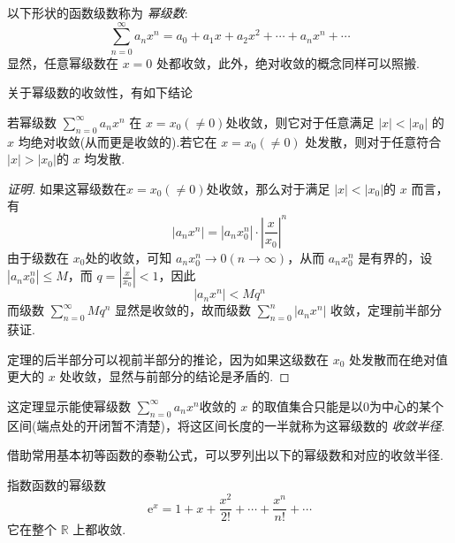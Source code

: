 以下形状的函数级数称为 \emph{幂级数}:
\[ \sum_{n=0}^{\infty} a_nx^n = a_0+a_1x+a_2x^2+\cdots + a_nx^n+\cdots \]
显然，任意幂级数在 $x=0$ 处都收敛，此外，绝对收敛的概念同样可以照搬.

关于幂级数的收敛性，有如下结论
\begin{theorem}
  若幂级数 $\sum_{n=0}^{\infty}a_nx^n$ 在 $x=x_0(\neq 0)$处收敛，则它对于任意满足 $|x|<|x_0|$ 的 $x$ 均绝对收敛(从而更是收敛的).若它在 $x=x_0(\neq 0)$ 处发散，则对于任意符合 $|x|>|x_0|$的 $x$ 均发散.
\end{theorem}

\begin{proof}[证明]
  如果这幂级数在$x=x_0(\neq 0)$处收敛，那么对于满足 $|x|<|x_0|$的 $x$ 而言，有
  \[ |a_nx^n| = |a_nx_0^n| \cdot \left| \frac{x}{x_0} \right|^n \]
  由于级数在 $x_0$处的收敛，可知 $a_nx_0^n \to 0 (n \to \infty)$，从而 $a_nx_0^n$ 是有界的，设 $|a_nx_0^n| \leqslant M$，而 $q=\left| \frac{x}{x_0} \right| < 1$，因此
  \[ |a_nx^n| < Mq^n \]
  而级数 $\sum_{n=0}^{\infty} Mq^n$ 显然是收敛的，故而级数 $\sum_{n=0}^n|a_nx^n|$ 收敛，定理前半部分获证.

  定理的后半部分可以视前半部分的推论，因为如果这级数在 $x_0$ 处发散而在绝对值更大的 $x$ 处收敛，显然与前部分的结论是矛盾的.
\end{proof}

这定理显示能使幂级数 $\sum_{n=0}^{\infty} a_nx^n$收敛的 $x$ 的取值集合只能是以$0$为中心的某个区间(端点处的开闭暂不清楚)，将这区间长度的一半就称为这幂级数的 \emph{收敛半径}.

\begin{example}
  借助常用基本初等函数的泰勒公式，可以罗列出以下的幂级数和对应的收敛半径.

  指数函数的幂级数
  \[ \mathrm{e}^x = 1 + x + \frac{x^2}{2!}+\cdots+\frac{x^n}{n!}+\cdots \]
  它在整个 $\mathbb{R}$ 上都收敛.
\end{example}

